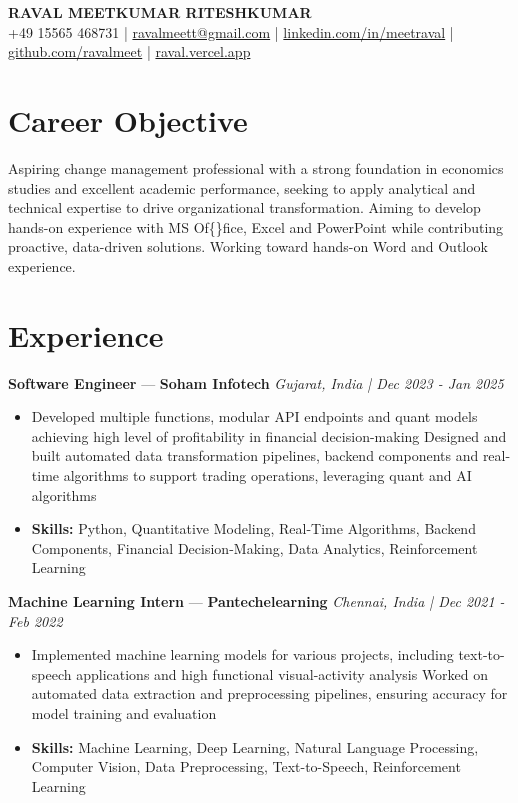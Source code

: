 \documentclass[a4paper,10pt]{article}
\begin{document}
\begin{center}
  {\Large\bfseries RAVAL MEETKUMAR RITESHKUMAR}\\[2pt]
  {\small +49 15565 468731 \;|\; \href{mailto:ravalmeett@gmail.com}{ravalmeett@gmail.com} \;|\; \href{https://www.linkedin.com/in/meetraval/}{linkedin.com/in/meetraval} \;|\; \href{https://github.com/ravalmeet}{github.com/ravalmeet} \;|\; \href{https://raval.vercel.app/}{raval.vercel.app}}
\end{center}
\vspace{-3pt}

\section*{Career Objective}
Aspiring change management professional with a strong foundation in economics studies and excellent academic performance, seeking to apply analytical and technical expertise to drive organizational transformation. Aiming to develop hands-on experience with MS Of\{\}fice, Excel and PowerPoint while contributing proactive, data-driven solutions. Working toward hands-on Word and Outlook experience.\par

\section*{Experience}
\textbf{Software Engineer} — \textbf{Soham Infotech} \hfill \textit{Gujarat, India \;|\; Dec 2023 - Jan 2025}\par
\vspace{1pt}
\begin{itemize}
  \item Developed multiple functions, modular API endpoints and quant models achieving high level of profitability in financial decision-making Designed and built automated data transformation pipelines, backend components and real-time algorithms to support trading operations, leveraging quant and AI algorithms
  \item \textbf{Skills:} Python, Quantitative Modeling, Real-Time Algorithms, Backend Components, Financial Decision-Making, Data Analytics, Reinforcement Learning
\end{itemize}
\vspace{3pt}
\textbf{Machine Learning Intern} — \textbf{Pantechelearning} \hfill \textit{Chennai, India \;|\; Dec 2021 - Feb 2022}\par
\vspace{1pt}
\begin{itemize}
  \item Implemented machine learning models for various projects, including text-to-speech applications and high functional visual-activity analysis Worked on automated data extraction and preprocessing pipelines, ensuring accuracy for model training and evaluation
  \item \textbf{Skills:} Machine Learning, Deep Learning, Natural Language Processing, Computer Vision, Data Preprocessing, Text-to-Speech, Reinforcement Learning
\end{itemize}
\end{document}
